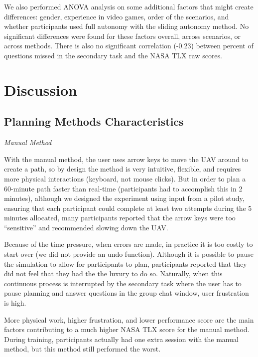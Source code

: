 We also performed ANOVA analysis on some additional factors that might create differences: gender, experience in video games, order of the scenarios, and whether participants used full autonomy with the sliding autonomy method. No significant differences were found for these factors overall, across scenarios, or across methods. There is also no significant correlation (-0.23) between percent of questions missed in the secondary task and the NASA TLX raw scores.

\section{Discussion} 
\label{sec:Discussion}

\subsection{Planning Methods Characteristics}

\noindent \textit{Manual Method}

With the manual method, the user uses arrow keys to move the UAV around to create a path, so by design the method is very intuitive, flexible, and requires more physical interactions (keyboard, not mouse clicks). But in order to plan a 60-minute path faster than real-time (participants had to accomplish this in 2 minutes), although we designed the experiment using input from a pilot study, ensuring that each participant could complete at least two attempts during the 5 minutes allocated, many participants reported that the arrow keys were too ``sensitive'' and recommended slowing down the UAV.

Because of the time pressure, when errors are made, in practice it is too costly to start over (we did not provide an undo function). Although it is possible to pause the simulation to allow for participants to plan, participants reported that they did not feel that they had the the luxury to do so. Naturally, when this continuous process is interrupted by the secondary task where the user has to pause planning and answer questions in the group chat window, user frustration is high. 

More physical work, higher frustration, and lower performance score are the main factors contributing to a much higher NASA TLX score for the manual method. During training, participants actually had one extra session with the manual method, but this method still performed the worst.

